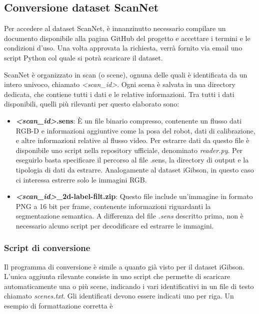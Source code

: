 \documentclass[12pt]{report}
\begin{document}
\subsection{Conversione dataset ScanNet}
\label{sec:conversione_dataset_scannet}

Per accedere al dataset ScanNet, è innanzinutto necessario compilare un documento disponibile alla pagina GitHub del progetto e accettare i termini e le condizioni d'uso. Una volta approvata la richiesta, verrà fornito via email uno script Python col quale si potrà scaricare il dataset.

ScanNet è organizzato in scan (o scene), ognuna delle quali è identificata da un intero univoco, chiamato \textit{<scan\_id>}. Ogni scena è salvata in una directory dedicata, che contiene tutti i dati e le relative informazioni. Tra tutti i dati disponibili, quelli più rilevanti per questo elaborato sono:

\begin{itemize}
	\item \textbf{\textit{<scan\_id>}.sens}: È un file binario compresso, contenente un flusso dati RGB-D e informazioni aggiuntive come la posa del robot, dati di calibrazione, e altre informazioni relative al flusso video. Per estrarre dati da questo file è disponibile uno script nella repository ufficiale, denominato \textit{reader.py}. Per eseguirlo basta specificare il percorso al file .sens, la directory di output e la tipologia di dati da estrarre. Analogamente al dataset iGibson, in questo caso ci interessa estrerre solo le immagini RGB.
	
	\item \textbf{\textit{<scan\_id>}\_2d-label-filt.zip}: Questo file include un'immagine in formato PNG a 16 bit per frame, contenente informazioni riguardanti la segmentazione semantica. A differenza del file \textit{.sens} descritto prima, non è necessario alcuno script per decodificare ed estrarre le immagini.
\end{itemize}

\subsubsection{Script di conversione}
\label{sec:script_di_conversione_scannet}

Il programma di conversione è simile a quanto già visto per il dataset iGibson. L'unica aggiunta rilevante consiste in uno script che permette di scaricare automaticamente una o più scene, indicando i vari identificativi in un file di testo chiamato \textit{scenes.txt}. Gli identificati devono essere indicati uno per riga. Un esempio di formattazione corretta è
\end{document}
